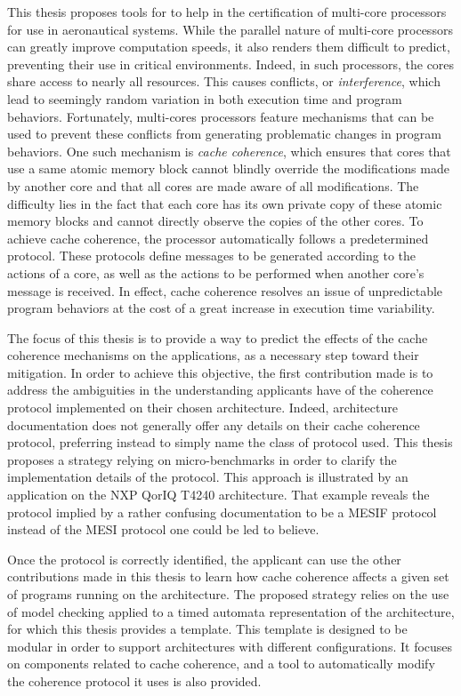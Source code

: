 This thesis proposes tools for to help in the certification of multi-core
processors for use in aeronautical systems. While the parallel nature of
multi-core processors can greatly improve computation speeds, it also renders
them difficult to predict, preventing their use in critical environments.
Indeed, in such processors, the cores share access to nearly all resources.
This causes conflicts, or \textit{interference}, which lead to seemingly random
variation in both execution time and program behaviors. Fortunately,
multi-cores processors feature mechanisms that can be used to prevent these
conflicts from generating problematic changes in program behaviors. One such
mechanism is \textit{cache coherence}, which ensures that cores that use a same
atomic memory block cannot blindly override the modifications made by another
core and that all cores are made aware of all modifications. The difficulty
lies in the fact that each core has its own private copy of these atomic memory
blocks and cannot directly observe the copies of the other cores. To achieve
cache coherence, the processor automatically follows a predetermined protocol.
These protocols define messages to be generated according to the actions of a
core, as well as the actions to be performed when another core's message is
received. In effect, cache coherence resolves an issue of unpredictable
program behaviors at the cost of a great increase in execution time
variability.

The focus of this thesis is to provide a way to predict the effects of the
cache coherence mechanisms on the applications, as a necessary step toward
their mitigation. In order to achieve this objective, the first contribution
made is to address the ambiguities in the understanding applicants have of the
coherence protocol implemented on their chosen architecture. Indeed,
architecture documentation does not generally offer any details on their cache
coherence protocol, preferring instead to simply name the class of protocol
used. This thesis proposes a strategy relying on micro-benchmarks in order to
clarify the implementation details of the protocol. This approach is illustrated
by an application on the NXP QorIQ T4240 architecture. That example reveals the
protocol implied by a rather confusing documentation to be a MESIF protocol
instead of the MESI protocol one could be led to believe.

Once the protocol is correctly identified, the applicant can use the other
contributions made in this thesis to learn how cache coherence affects a given
set of programs running on the architecture. The proposed strategy relies on
the use of model checking applied to a timed automata representation of the
architecture, for which this thesis provides a template. This template is
designed to be modular in order to support architectures with different
configurations. It focuses on components related to cache coherence, and a tool
to automatically modify the coherence protocol it uses is also provided.

